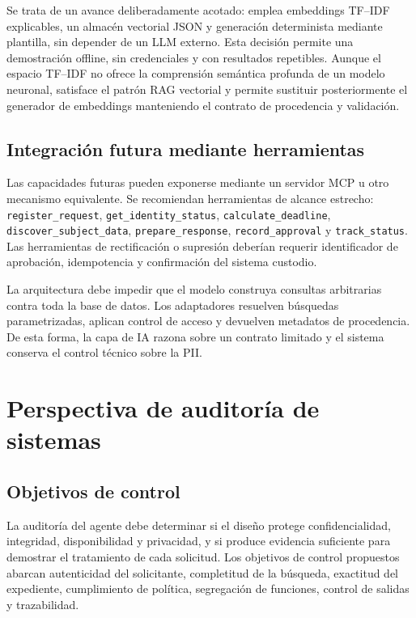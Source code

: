 \documentclass[11pt,a4paper]{article}
\begin{document}
Se trata de un avance deliberadamente acotado: emplea embeddings TF--IDF explicables, un almacén vectorial JSON y generación determinista mediante plantilla, sin depender de un LLM externo. Esta decisión permite una demostración offline, sin credenciales y con resultados repetibles. Aunque el espacio TF--IDF no ofrece la comprensión semántica profunda de un modelo neuronal, satisface el patrón RAG vectorial y permite sustituir posteriormente el generador de embeddings manteniendo el contrato de procedencia y validación.


\subsection{Integración futura mediante herramientas}

Las capacidades futuras pueden exponerse mediante un servidor MCP u otro mecanismo equivalente. Se recomiendan herramientas de alcance estrecho: \texttt{register\_request}, \texttt{get\_identity\_status}, \texttt{calculate\_deadline}, \texttt{discover\_subject\_data}, \texttt{prepare\_response}, \texttt{record\_approval} y \texttt{track\_status}. Las herramientas de rectificación o supresión deberían requerir identificador de aprobación, idempotencia y confirmación del sistema custodio.

La arquitectura debe impedir que el modelo construya consultas arbitrarias contra toda la base de datos. Los adaptadores resuelven búsquedas parametrizadas, aplican control de acceso y devuelven metadatos de procedencia. De esta forma, la capa de IA razona sobre un contrato limitado y el sistema conserva el control técnico sobre la PII.

\section{Perspectiva de auditoría de sistemas}

\subsection{Objetivos de control}

La auditoría del agente debe determinar si el diseño protege confidencialidad, integridad, disponibilidad y privacidad, y si produce evidencia suficiente para demostrar el tratamiento de cada solicitud. Los objetivos de control propuestos abarcan autenticidad del solicitante, completitud de la búsqueda, exactitud del expediente, cumplimiento de política, segregación de funciones, control de salidas y trazabilidad.
\end{document}
